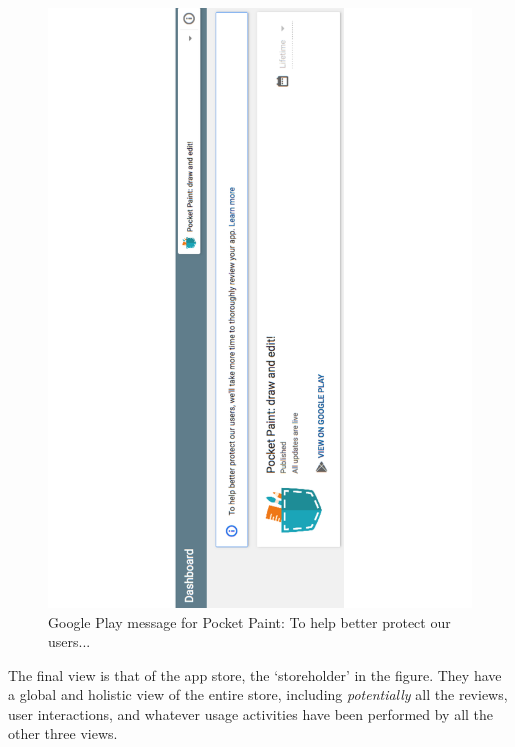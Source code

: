 \begin{figure}
    \includegraphics[width=\linewidth]{images/android-vitals-screenshots/catrobat/pocketpaint-to-help-better-protect-users.pdf}
    \caption{Google Play message for Pocket Paint: To help better protect our users...}
    \label{fig:pocketpaint-to-help-better-protect-users}
\end{figure}

The final view is that of the app store, the `storeholder' in the figure. They have a global and holistic view of the entire store, including \textit{potentially} all the reviews, user interactions, and whatever usage activities have been performed by all the other three views. 

